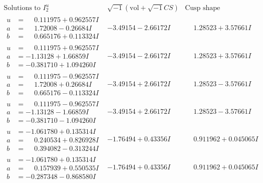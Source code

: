 \documentclass[1p]{elsarticle_modified}
\theoremstyle{definition}
\newcommand{\I}{\sqrt{-1}}
\begin{document}
$$\begin{array}{c|c|c}  
\text{Solutions to }I^u_{2}& \I (\text{vol} + \sqrt{-1}CS) & \text{Cusp shape}\\
 \hline 
\begin{aligned}
u &= \phantom{-}0.111975 + 0.962557 I \\
a &= \phantom{-}1.72008 - 0.26684 I \\
b &= \phantom{-}0.665176 + 0.113324 I\end{aligned}
 & -3.49154 - 2.66172 I & \phantom{-}1.28523 + 3.57661 I \\ \hline\begin{aligned}
u &= \phantom{-}0.111975 + 0.962557 I \\
a &= -1.13128 + 1.66859 I \\
b &= -0.381710 + 1.094260 I\end{aligned}
 & -3.49154 - 2.66172 I & \phantom{-}1.28523 + 3.57661 I \\ \hline\begin{aligned}
u &= \phantom{-}0.111975 - 0.962557 I \\
a &= \phantom{-}1.72008 + 0.26684 I \\
b &= \phantom{-}0.665176 - 0.113324 I\end{aligned}
 & -3.49154 + 2.66172 I & \phantom{-}1.28523 - 3.57661 I \\ \hline\begin{aligned}
u &= \phantom{-}0.111975 - 0.962557 I \\
a &= -1.13128 - 1.66859 I \\
b &= -0.381710 - 1.094260 I\end{aligned}
 & -3.49154 + 2.66172 I & \phantom{-}1.28523 - 3.57661 I \\ \hline\begin{aligned}
u &= -1.061780 + 0.135314 I \\
a &= \phantom{-}0.240534 + 0.826928 I \\
b &= \phantom{-}0.394082 - 0.313244 I\end{aligned}
 & -1.76494 + 0.43356 I & \phantom{-}0.911962 + 0.045065 I \\ \hline\begin{aligned}
u &= -1.061780 + 0.135314 I \\
a &= \phantom{-}0.157939 + 0.550535 I \\
b &= -0.287348 - 0.868580 I\end{aligned}
 & -1.76494 + 0.43356 I & \phantom{-}0.911962 + 0.045065 I \\ \hline\begin{aligned}

\end{aligned}
\end{array}$$
\end{document}
